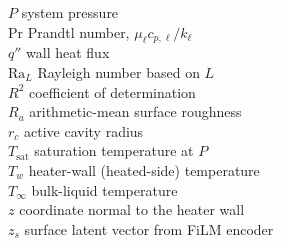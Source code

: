 \begin{tabbing}
$P$                \> system pressure                                     \> [Pa] \\
$\mathrm{Pr}$      \> Prandtl number, $\mu_{\ell}c_{p,\ell}/k_{\ell}$     \> [---] \\
$q''$              \> wall heat flux                                      \> [\si{W/m^2}] \\
$\mathrm{Ra}_L$    \> Rayleigh number based on $L$                        \> [---] \\
$R^{2}$            \> coefficient of determination                        \> [---] \\
$R_a$              \> arithmetic-mean surface roughness                   \> [\si{\micro m}] \\
$r_c$              \> active cavity radius                                \> [\si{\micro m}] \\
$T_{\mathrm{sat}}$ \> saturation temperature at $P$                       \> [K] \\
$T_w$              \> heater-wall (heated-side) temperature               \> [K] \\
$T_{\infty}$       \> bulk-liquid temperature                             \> [K] \\
$z$                \> coordinate normal to the heater wall                \> [m] \\
$z_s$              \> surface latent vector from FiLM encoder             \> [---] \\
\end{tabbing}


